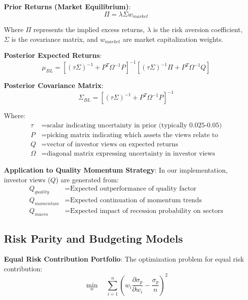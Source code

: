 \documentclass[12pt,a4paper]{article}
\begin{document}
\textbf{Prior Returns (Market Equilibrium)}:
\begin{equation}
\Pi = \lambda \Sigma w_{market}
\end{equation}

Where $\Pi$ represents the implied excess returns, $\lambda$ is the risk aversion coefficient, $\Sigma$ is the covariance matrix, and $w_{market}$ are market capitalization weights.

\textbf{Posterior Expected Returns}:
\begin{equation}
\mu_{BL} = \left[(\tau\Sigma)^{-1} + P^T\Omega^{-1}P\right]^{-1}\left[(\tau\Sigma)^{-1}\Pi + P^T\Omega^{-1}Q\right]
\end{equation}

\textbf{Posterior Covariance Matrix}:
\begin{equation}
\Sigma_{BL} = \left[(\tau\Sigma)^{-1} + P^T\Omega^{-1}P\right]^{-1}
\end{equation}

Where:
\begin{align}
\tau &= \text{scalar indicating uncertainty in prior (typically 0.025-0.05)} \\
P &= \text{picking matrix indicating which assets the views relate to} \\
Q &= \text{vector of investor views on expected returns} \\
\Omega &= \text{diagonal matrix expressing uncertainty in investor views}
\end{align}

\textbf{Application to Quality Momentum Strategy}:
In our implementation, investor views ($Q$) are generated from:
\begin{align}
Q_{quality} &= \text{Expected outperformance of quality factor} \\
Q_{momentum} &= \text{Expected continuation of momentum trends} \\
Q_{macro} &= \text{Expected impact of recession probability on sectors}
\end{align}

\subsection{Risk Parity and Budgeting Models}

\textbf{Equal Risk Contribution Portfolio}:
The optimization problem for equal risk contribution:
\begin{equation}
\min_w \quad \sum_{i=1}^n \left(w_i \frac{\partial \sigma_p}{\partial w_i} - \frac{\sigma_p}{n}\right)^2
\end{equation}
\end{document}
